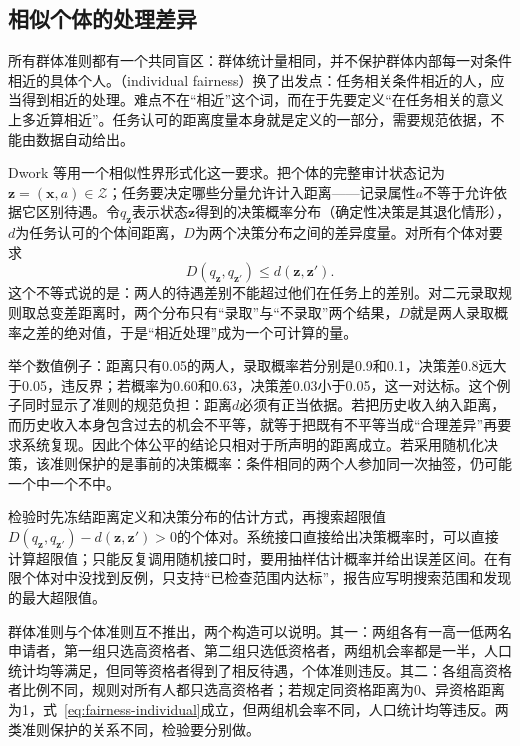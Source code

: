 \subsection{相似个体的处理差异}
\label{sec:fairness-individual-comparison}

所有群体准则都有一个共同盲区：群体统计量相同，并不保护群体内部每一对条件相近的具体个人。（individual fairness）换了出发点：任务相关条件相近的人，应当得到相近的处理。难点不在“相近”这个词，而在于先要定义“在任务相关的意义上多近算相近”。任务认可的距离度量本身就是定义的一部分，需要规范依据，不能由数据自动给出。

Dwork 等用一个相似性界形式化这一要求。把个体的完整审计状态记为$\bm z=(\bm x,a)\in\mathcal Z$；任务要决定哪些分量允许计入距离——记录属性$a$不等于允许依据它区别待遇。令$q_{\bm z}$表示状态$\bm z$得到的决策概率分布（确定性决策是其退化情形），$d$为任务认可的个体间距离，$D$为两个决策分布之间的差异度量。对所有个体对要求
\begin{equation}
 D(q_{\bm z},q_{\bm z'})\leq d(\bm z,\bm z').
 \label{eq:fairness-individual}
\end{equation}
这个不等式说的是：两人的待遇差别不能超过他们在任务上的差别。对二元录取规则取总变差距离时，两个分布只有“录取”与“不录取”两个结果，$D$就是两人录取概率之差的绝对值，于是“相近处理”成为一个可计算的量。

举个数值例子：距离只有0.05的两人，录取概率若分别是0.9和0.1，决策差0.8远大于0.05，违反界；若概率为0.60和0.63，决策差0.03小于0.05，这一对达标。这个例子同时显示了准则的规范负担：距离$d$必须有正当依据。若把历史收入纳入距离，而历史收入本身包含过去的机会不平等，就等于把既有不平等当成“合理差异”再要求系统复现。因此个体公平的结论只相对于所声明的距离成立。若采用随机化决策，该准则保护的是事前的决策概率：条件相同的两个人参加同一次抽签，仍可能一个中一个不中。

检验时先冻结距离定义和决策分布的估计方式，再搜索超限值$D(q_{\bm z},q_{\bm z'})-d(\bm z,\bm z')>0$的个体对。系统接口直接给出决策概率时，可以直接计算超限值；只能反复调用随机接口时，要用抽样估计概率并给出误差区间。在有限个体对中没找到反例，只支持“已检查范围内达标”，报告应写明搜索范围和发现的最大超限值。

群体准则与个体准则互不推出，两个构造可以说明。其一：两组各有一高一低两名申请者，第一组只选高资格者、第二组只选低资格者，两组机会率都是一半，人口统计均等满足，但同等资格者得到了相反待遇，个体准则违反。其二：各组高资格者比例不同，规则对所有人都只选高资格者；若规定同资格距离为0、异资格距离为1，式~\eqref{eq:fairness-individual}成立，但两组机会率不同，人口统计均等违反。两类准则保护的关系不同，检验要分别做。

